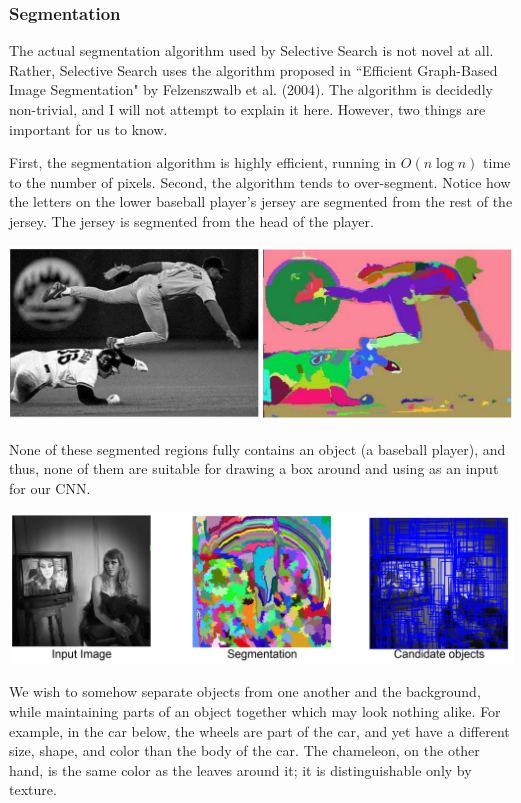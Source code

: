 \documentclass{article}
\begin{document}
\subsubsection{Segmentation}
The actual segmentation algorithm used by Selective Search is not novel at all. Rather, Selective Search uses the algorithm proposed in ``Efficient Graph-Based Image Segmentation" by Felzenszwalb et al. (2004). The algorithm is decidedly non-trivial, and I will not attempt to explain it here. However, two things are important for us to know.

First, the segmentation algorithm is highly efficient, running in $O(n\log n)$ time to the number of pixels. Second, the algorithm tends to over-segment. Notice how the letters on the lower baseball player's jersey are segmented from the rest of the jersey. The jersey is segmented from the head of the player.

\begin{center}
\includegraphics[scale=0.6]{graphbasedsegmentation.PNG}
\end{center}

None of these segmented regions fully contains an object (a baseball player), and thus, none of them are suitable for drawing a box around and using as an input for our CNN.

\begin{center}
\includegraphics[scale=0.4]{selective1.PNG}
\end{center}

We wish to somehow separate objects from one another and the background, while maintaining parts of an object together which may look nothing alike. For example, in the car below, the wheels are part of the car, and yet have a different size, shape, and color than the body of the car. The chameleon, on the other hand, is the same color as the leaves around it; it is distinguishable only by texture.
\end{document}
